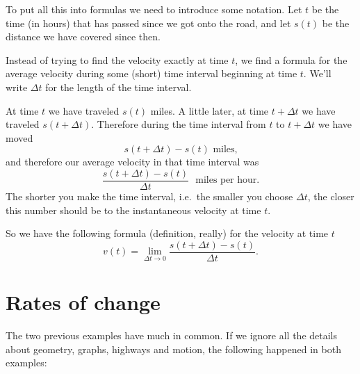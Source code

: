 To put all this into formulas we need to introduce some notation.  Let $t$ be
the time (in hours) that has passed since we got onto the road, and let $s(t)$
be the distance we have covered since then.

Instead of trying to find the velocity exactly at time $t$, we find a formula for the
average velocity during some (short) time interval beginning at time $t$.  We'll write
$\Delta t$ for the length of the time interval.

At time $t$ we have traveled $s(t)$ miles.  A little later, at time $t+\Delta t$
we have traveled $s(t+\Delta t)$.  Therefore during the time interval from $t$
to $t+\Delta t$ we
have moved
\[
s(t+\Delta t) - s(t)\text{ miles,}
\]
and therefore our average velocity in that time interval was
\[
\frac{s(t+\Delta t) - s(t)}{\Delta t} \text{~ miles per hour.}
\]
The shorter you make the time interval, i.e.\ the smaller you choose $\Delta t$, the
closer this number should be to the instantaneous velocity at time $t$.

So we have the following formula (definition, really) for the velocity at time $t$
\begin{equation}
  v(t) = \lim_{\Delta t\to0} \frac{s(t+\Delta t)- s(t)}{\Delta t}.
\end{equation}

\section{Rates of change}
\label{sec:rates-of-change} The two previous examples have much in common.  If
we ignore all the details about geometry, graphs, highways and motion, the
following happened in both examples:

